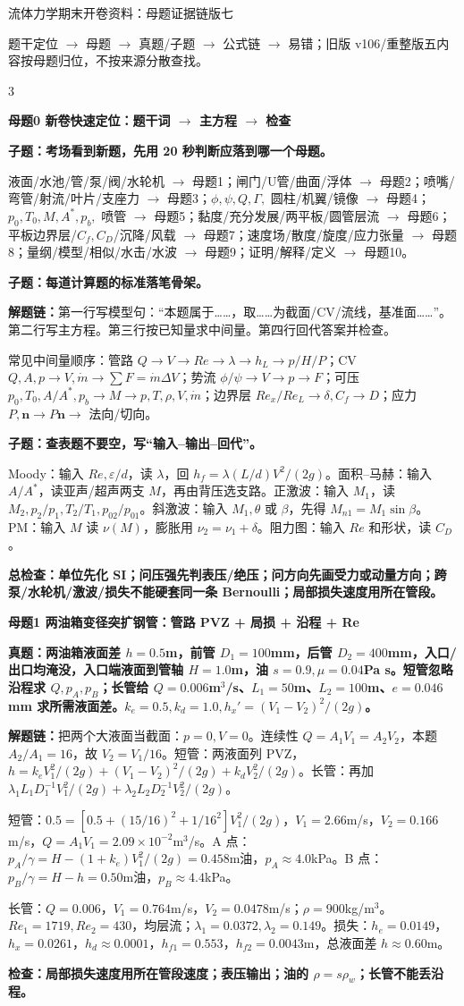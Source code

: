 \documentclass[a4paper]{article}
\newcommand{\mt}[1]{\vspace{0.45pt}\colorbox{M}{\parbox{\dimexpr\linewidth-2\fboxsep}{\color{white}\bfseries #1}}\par}
\newcommand{\qt}[1]{\vspace{0.25pt}\colorbox{Q}{\parbox{\dimexpr\linewidth-2\fboxsep}{\color{white}\bfseries #1}}\par}
\newcommand{\ans}[1]{\colorbox{G}{\parbox{\dimexpr\linewidth-2\fboxsep}{#1}}\par}
\newcommand{\warn}[1]{\colorbox{Y}{\parbox{\dimexpr\linewidth-2\fboxsep}{\color{E}\bfseries #1}}\par}
\newcommand{\chain}[1]{{\color{A}\bfseries 解题链：}#1\par}
\begin{document}
\fontsize{3.16}{3.34}\selectfont
\begin{center}
{\heiti\fontsize{6.5}{6.8}\selectfont 流体力学期末开卷资料：母题证据链版七}\par
{\fontsize{3.20}{3.38}\selectfont 题干定位 $\to$ 母题 $\to$ 真题/子题 $\to$ 公式链 $\to$ 易错；旧版 v106/重整版五内容按母题归位，不按来源分散查找。}
\end{center}
\vspace{-3.4pt}
\begin{multicols}{3}

\mt{母题0 新卷快速定位：题干词 $\to$ 主方程 $\to$ 检查}
\qt{子题：考场看到新题，先用 20 秒判断应落到哪一个母题。}
\ans{液面/水池/管/泵/阀/水轮机 $\to$ 母题1；闸门/U管/曲面/浮体 $\to$ 母题2；喷嘴/弯管/射流/叶片/支座力 $\to$ 母题3；$\phi,\psi,Q,\Gamma,$ 圆柱/机翼/镜像 $\to$ 母题4；$p_0,T_0,M,A^*,p_b,$ 喷管 $\to$ 母题5；黏度/充分发展/两平板/圆管层流 $\to$ 母题6；平板边界层/$C_f,C_D$/沉降/风载 $\to$ 母题7；速度场/散度/旋度/应力张量 $\to$ 母题8；量纲/模型/相似/水击/水波 $\to$ 母题9；证明/解释/定义 $\to$ 母题10。}
\qt{子题：每道计算题的标准落笔骨架。}
\chain{第一行写模型句：“本题属于……，取……为截面/CV/流线，基准面……”。第二行写主方程。第三行按已知量求中间量。第四行回代答案并检查。}
\ans{常见中间量顺序：管路 $Q\to V\to Re\to\lambda\to h_L\to p/H/P$；CV $Q,A,p\to V,\dot m\to \sum F=\dot m\Delta V$；势流 $\phi/\psi\to V\to p\to F$；可压 $p_0,T_0,A/A^*,p_b\to M\to p,T,\rho,V,\dot m$；边界层 $Re_x/Re_L\to\delta,C_f\to D$；应力 $P,\bm n\to P\bm n\to$ 法向/切向。}
\qt{子题：查表题不要空，写“输入--输出--回代”。}
\ans{Moody：输入 $Re,\varepsilon/d$，读 $\lambda$，回 $h_f=\lambda(L/d)V^2/(2g)$。面积--马赫：输入 $A/A^*$，读亚声/超声两支 $M$，再由背压选支路。正激波：输入 $M_1$，读 $M_2,p_2/p_1,T_2/T_1,p_{02}/p_{01}$。斜激波：输入 $M_1,\theta$ 或 $\beta$，先得 $M_{n1}=M_1\sin\beta$。PM：输入 $M$ 读 $\nu(M)$，膨胀用 $\nu_2=\nu_1+\delta$。阻力图：输入 $Re$ 和形状，读 $C_D$。}
\warn{总检查：单位先化 SI；问压强先判表压/绝压；问方向先画受力或动量方向；跨泵/水轮机/激波/损失不能硬套同一条 Bernoulli；局部损失速度用所在管段。}


\mt{母题1 两油箱变径突扩钢管：管路 PVZ + 局损 + 沿程 + Re}
\qt{真题：两油箱液面差 $h=0.5$m，前管 $D_1=100$mm，后管 $D_2=400$mm，入口/出口均淹没，入口端液面到管轴 $H=1.0$m，油 $s=0.9,\mu=0.04$Pa s。短管忽略沿程求 $Q,p_A,p_B$；长管给 $Q=0.006$m$^3$/s、$L_1=50$m、$L_2=100$m、$e=0.046$mm 求所需液面差。$k_e=0.5,k_d=1.0,h_x'=(V_1-V_2)^2/(2g)$。}
\chain{把两个大液面当截面：$p=0,V=0$。连续性 $Q=A_1V_1=A_2V_2$，本题 $A_2/A_1=16$，故 $V_2=V_1/16$。短管：两液面列 PVZ，$h=k_eV_1^2/(2g)+(V_1-V_2)^2/(2g)+k_dV_2^2/(2g)$。长管：再加 $\lambda_1L_1D_1^{-1}V_1^2/(2g)+\lambda_2L_2D_2^{-1}V_2^2/(2g)$。}
\ans{短管：$0.5=[0.5+(15/16)^2+1/16^2]V_1^2/(2g)$，$V_1=2.66$m/s，$V_2=0.166$m/s，$Q=A_1V_1=2.09\times10^{-2}$m$^3$/s。A 点：$p_A/\gamma=H-(1+k_e)V_1^2/(2g)=0.458$m油，$p_A\approx4.0$kPa。B 点：$p_B/\gamma=H-h=0.50$m油，$p_B\approx4.4$kPa。}
\ans{长管：$Q=0.006$，$V_1=0.764$m/s，$V_2=0.0478$m/s；$\rho=900$kg/m$^3$。$Re_1=1719,Re_2=430$，均层流；$\lambda_1=0.0372,\lambda_2=0.149$。损失：$h_e=0.0149$，$h_x=0.0261$，$h_d\approx0.0001$，$h_{f1}=0.553$，$h_{f2}=0.0043$m，总液面差 $h\approx0.60$m。}
\warn{检查：局部损失速度用所在管段速度；表压输出；油的 $\rho=s\rho_w$；长管不能丢沿程。}


\end{multicols}
\end{document}
